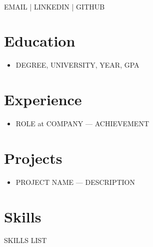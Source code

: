 \documentclass[letterpaper,10pt]{article}
\begin{document}
 \\
EMAIL | LINKEDIN | GITHUB

\vspace{0.2cm}

\section*{Education}
\begin{itemize}
    \item DEGREE, UNIVERSITY, YEAR, GPA
\end{itemize}

\section*{Experience}
\begin{itemize}
    \item ROLE at COMPANY — ACHIEVEMENT
\end{itemize}

\section*{Projects}
\begin{itemize}
    \item PROJECT NAME — DESCRIPTION
\end{itemize}

\section*{Skills}
SKILLS LIST
\end{document}
